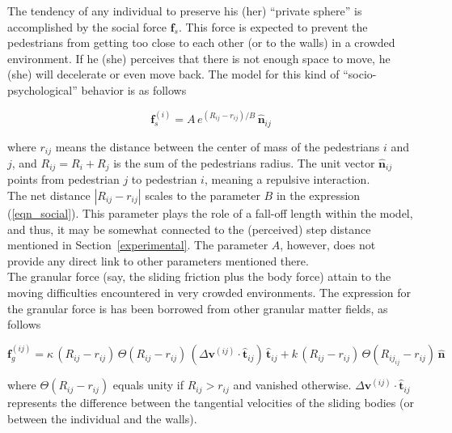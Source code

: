 \documentclass[preprint,12pt]{elsarticle}
\begin{document}
The tendency of any individual to preserve his (her) ``private sphere'' is 
accomplished by the social force $\mathbf{f}_s$. This force is expected to 
prevent the pedestrians from getting too close to each other (or to the walls) 
in a crowded environment. If he (she) perceives that there is not enough space 
to move, he (she) will decelerate or even move back. The model for this kind of 
``socio-psychological'' behavior is as follows

\begin{equation}
 \mathbf{f}_s^{(i)}=A\,e^{(R_{ij}-r_{ij})/B}\,\hat{\mathbf{n}}_{ij}
 \label{eqn_social}
\end{equation}

\noindent where $r_{ij}$ means the distance between the center of mass of the 
pedestrians $i$ and $j$, and $R_{ij}=R_i+R_j$ is the sum of the pedestrians 
radius. The unit vector $\hat{\mathbf{n}}_{ij}$ points from pedestrian $j$ to 
pedestrian $i$, meaning a repulsive interaction.\\ 

The net distance $|R_{ij}-r_{ij}|$ scales to the parameter $B$ in the 
expression (\ref{eqn_social}). This parameter plays the role of a fall-off 
length within the model, and thus, it may be somewhat connected to the 
(perceived) step distance mentioned in Section~\ref{experimental}. The 
parameter $A$, however, does not provide any direct link to other parameters 
mentioned there. \\    

The granular force (say, the sliding friction plus the body force) attain to 
the moving difficulties encountered in very crowded environments. The 
expression for the granular force is has been borrowed from other granular 
matter fields, as follows

\begin{equation}
 \mathbf{f}_g^{(ij)}=\kappa\,(R_{ij}-r_{ij})\,\Theta(R_{ij}-r_{ij})
\,(\Delta\mathbf{v}^{(ij)}\cdot\hat{\mathbf{t}}_{ij})\,\hat{\mathbf{t}}_{ij}+
k\,(R_{ij}-r_{ij})\,\Theta(R_{ij}_{ij}-r_{ij})
\,\hat{\mathbf{n}}\label{eqn_friction}
\end{equation}

\noindent where $\Theta(R_{ij}-r_{ij})$ equals unity if $R_{ij}>r_{ij}$ and 
vanished otherwise. $\Delta\mathbf{v}^{(ij)}\cdot\hat{\mathbf{t}}_{ij}$ 
represents the difference between the tangential velocities of the sliding 
bodies (or between the individual and the walls).    \\
\end{document}
